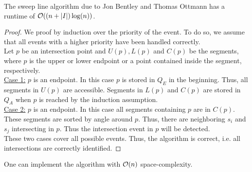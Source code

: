         \begin{theorem}
            The sweep line algorithm due to Jon Bentley and Thomas Ottmann has a runtime of $\mathcal{O}((n + \vert I \vert)\log(n))$.
        \end{theorem}
        \begin{proof}
            We proof by induction over the priority of the event. To do so, we assume that all events with a higher priority have been handled correctly. \\
            Let $p$ be an intersection point and $U(p), L(p)$ and $C(p)$ be the segments, where $p$ is the upper or lower endpoint or a point contained inside the segment, respectively. \\
            \underline{Case 1:} $p$ is an endpoint. In this case $p$ is stored in $Q_E$ in the beginning. Thus, all segments in $U(p)$ are accessible. Segments in $L(p)$ and $C(p)$ are stored in $Q_A$ when $p$ is reached by the induction assumption. \\
            \underline{Case 2:} $p$ is an endpoint. In this case all segments containing $p$ are in $C(p)$. These segments are sorted by angle around $p$. Thus, there are neighboring $s_i$ and $s_j$ intersecting in $p$. Thus the intersection event in $p$ will be detected. \\
            These two cases cover all possible events. Thus, the algorithm is correct, i.e. all intersections are correctly identified. 
        \end{proof}
        
        \begin{remark}
            One can implement the algorithm with $\mathcal{O}(n)$ space-complexity. 
        \end{remark} 